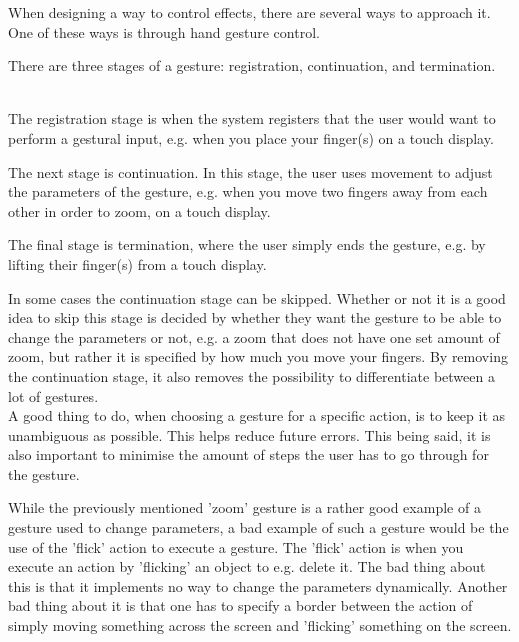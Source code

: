 When designing a way to control effects, there are several ways to approach it. One of these ways is through hand gesture control.

There are three stages of a gesture: registration, continuation, and termination\citep[pp. 127-134]{Wigdor_2011}.\\

\begin{minipage}{\linewidth}%
\label{Gestures}
\end{minipage}\\

The registration stage is when the system registers that the user would want to perform a gestural input, e.g. when you place your finger(s) on a touch display. 

The next stage is continuation. In this stage, the user uses movement to adjust the parameters of the gesture, e.g. when you move two fingers away from each other in order to zoom, on a touch display.

The final stage is termination, where the user simply ends the gesture, e.g. by lifting their finger(s) from a touch display.

In some cases the continuation stage can be skipped. Whether or not it is a good idea to skip this stage is decided by whether they want the gesture to be able to change the parameters or not, e.g. a zoom that does not have one set amount of zoom, but rather it is specified by how much you move your fingers. By removing the continuation stage, it also removes the possibility to differentiate between a lot of gestures. \\

A good thing to do, when choosing a gesture for a specific action, is to keep it as unambiguous as possible. This helps reduce future errors. This being said, it is also important to minimise the amount of steps the user has to go through for the gesture.

While the previously mentioned 'zoom' gesture is a rather good example of a gesture used to change parameters, a bad example of such a gesture would be the use of the 'flick' action to execute a gesture. The 'flick' action is when you execute an action by 'flicking' an object to e.g. delete it. The bad thing about this is that it implements no way to change the parameters dynamically. Another bad thing about it is that one has to specify a border between the action of simply moving something across the screen and 'flicking' something on the screen.

